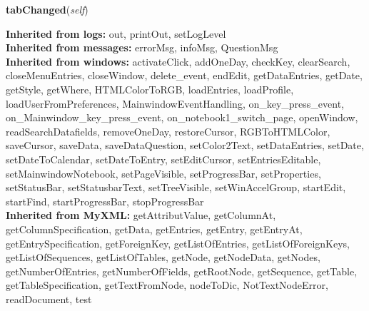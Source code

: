     \label{cuon:Web2:web2:web2window:tabChanged}
    \vspace{0.5ex}

    \begin{boxedminipage}{\textwidth}

    \raggedright \textbf{tabChanged}(\textit{self})

    \end{boxedminipage}

  \textbf{Inherited from logs:}
    out,
    printOut,
    setLogLevel
    \\
  \textbf{Inherited from messages:}
    errorMsg,
    infoMsg,
    QuestionMsg
    \\
  \textbf{Inherited from windows:}
    activateClick,
    addOneDay,
    checkKey,
    clearSearch,
    closeMenuEntries,
    closeWindow,
    delete\_event,
    endEdit,
    getDataEntries,
    getDate,
    getStyle,
    getWhere,
    HTMLColorToRGB,
    loadEntries,
    loadProfile,
    loadUserFromPreferences,
    MainwindowEventHandling,
    on\_key\_press\_event,
    on\_Mainwindow\_key\_press\_event,
    on\_notebook1\_switch\_page,
    openWindow,
    readSearchDatafields,
    removeOneDay,
    restoreCursor,
    RGBToHTMLColor,
    saveCursor,
    saveData,
    saveDataQuestion,
    setColor2Text,
    setDataEntries,
    setDate,
    setDateToCalendar,
    setDateToEntry,
    setEditCursor,
    setEntriesEditable,
    setMainwindowNotebook,
    setPageVisible,
    setProgressBar,
    setProperties,
    setStatusBar,
    setStatusbarText,
    setTreeVisible,
    setWinAccelGroup,
    startEdit,
    startFind,
    startProgressBar,
    stopProgressBar
    \\
  \textbf{Inherited from MyXML:}
    getAttributValue,
    getColumnAt,
    getColumnSpecification,
    getData,
    getEntries,
    getEntry,
    getEntryAt,
    getEntrySpecification,
    getForeignKey,
    getListOfEntries,
    getListOfForeignKeys,
    getListOfSequences,
    getListOfTables,
    getNode,
    getNodeData,
    getNodes,
    getNumberOfEntries,
    getNumberOfFields,
    getRootNode,
    getSequence,
    getTable,
    getTableSpecification,
    getTextFromNode,
    nodeToDic,
    NotTextNodeError,
    readDocument,
    test
